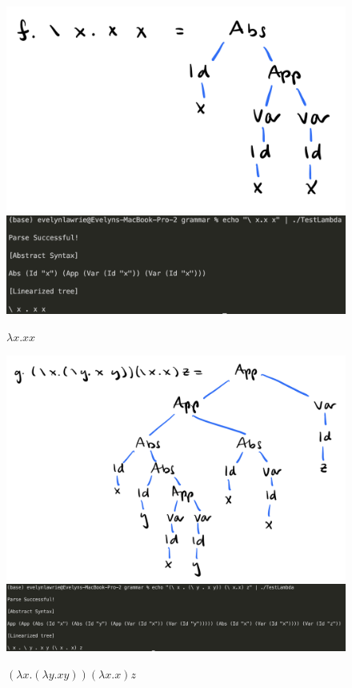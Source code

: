 \documentclass{article}
\theoremstyle{theorem}
\theoremstyle{definition}
\theoremstyle{remark}
\begin{document}
\begin{figure}[H]
\begin{center}
\includegraphics[scale=0.4]{img/fAST.png}
\includegraphics[scale=0.4]{img/ASTf.png}
\end{center}
\caption{$\lambda x. x x$}\label{ASTf}
\end{figure}

\begin{figure}[H]
\begin{center}
\includegraphics[scale=0.4]{img/gAST.png}
\includegraphics[scale=0.4]{img/ASTg.png}
\end{center}
\caption{$(\lambda x. (\lambda y. x y)) (\lambda x. x) z$}\label{ASTg}
\end{figure}
\end{document}
